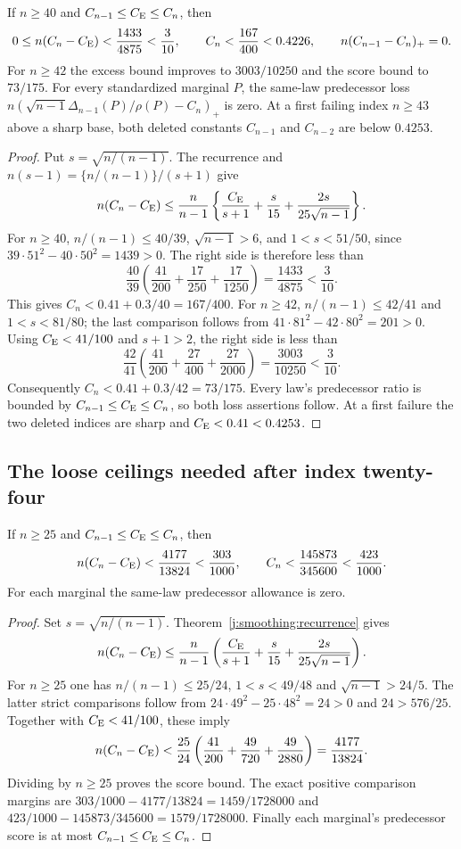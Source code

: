 \begin{corollary}
\label{j:smoothing:entry}
If $n\ge40$ and $C_{n-1}\le C_{\mathrm E}\le C_n$, then
\[
 0\le n(C_n-C_{\mathrm E})<\frac{1433}{4875}<\frac3{10},
 \qquad C_n<\frac{167}{400}<0.4226,
 \qquad n(C_{n-1}-C_n)_+=0.
\]
For $n\ge42$ the excess bound improves to $3003/10250$ and
the score bound to $73/175$.
For every standardized marginal $P$, the same-law predecessor loss
$n(\sqrt{n-1}\Delta_{n-1}(P)/\rho(P)-C_n)_+$ is zero.
At a first failing index $n\ge43$ above a sharp base, both deleted
constants $C_{n-1}$ and $C_{n-2}$ are below $0.4253$.
\end{corollary}
\begin{proof}
Put $s=\sqrt{n/(n-1)}$. The recurrence and
$n(s-1)=\{n/(n-1)\}/(s+1)$ give
\[
 n(C_n-C_{\mathrm E})\le\frac n{n-1}
 \left\{\frac{C_{\mathrm E}}{s+1}+\frac{s}{15}
                  +\frac{2s}{25\sqrt{n-1}}\right\}.
\]
For $n\ge40$, $n/(n-1)\le40/39$, $\sqrt{n-1}>6$, and
$1<s<51/50$, since $39\cdot51^2-40\cdot50^2=1439>0$.
The right side is therefore less than
\[
 \frac{40}{39}\left(\frac{41}{200}
                  +\frac{17}{250}+\frac{17}{1250}\right)
 =\frac{1433}{4875}<\frac3{10}.
\]
This gives $C_n<0.41+0.3/40=167/400$.
For $n\ge42$, $n/(n-1)\le42/41$ and
$1<s<81/80$; the last comparison follows from
$41\cdot81^2-42\cdot80^2=201>0$.
Using $C_{\mathrm E}<41/100$ and $s+1>2$, the right side is less than
\[
 \frac{42}{41}\left(\frac{41}{200}
                    +\frac{27}{400}+\frac{27}{2000}\right)
 =\frac{3003}{10250}<\frac3{10}.
\]
Consequently $C_n<0.41+0.3/42=73/175$.
Every law's predecessor ratio is bounded by $C_{n-1}\le C_{\mathrm E}\le C_n$,
so both loss assertions follow. At a first failure the two deleted
indices are sharp and $C_{\mathrm E}<0.41<0.4253$.
\end{proof}

\subsection{The loose ceilings needed after index twenty-four}
\label{j:smoothing:finite-ceilings}
\begin{lemma}\label{j:smoothing:entry25}
If $n\ge25$ and $C_{n-1}\le C_{\mathrm E}\le C_n$, then
\[
 n(C_n-C_{\mathrm E})<\frac{4177}{13824}<\frac{303}{1000},
 \qquad C_n<\frac{145873}{345600}<\frac{423}{1000}.
\]
For each marginal the same-law predecessor allowance is zero.
\end{lemma}
\begin{proof}
Set $s=\sqrt{n/(n-1)}$. Theorem~\ref{j:smoothing:recurrence} gives
\[
 n(C_n-C_{\mathrm E})\le\frac{n}{n-1}
 \left(\frac{C_{\mathrm E}}{s+1}+\frac{s}{15}
                       +\frac{2s}{25\sqrt{n-1}}\right).
\]
For $n\ge25$ one has $n/(n-1)\le25/24$,
$1<s<49/48$ and $\sqrt{n-1}>24/5$.
The latter strict comparisons follow from
$24\cdot49^2-25\cdot48^2=24>0$ and $24>576/25$.
Together with $C_{\mathrm E}<41/100$, these imply
\[
 n(C_n-C_{\mathrm E})<\frac{25}{24}
  \left(\frac{41}{200}+\frac{49}{720}+\frac{49}{2880}\right)
 =\frac{4177}{13824}.
\]
Dividing by $n\ge25$ proves the score bound. The exact positive
comparison margins are
$303/1000-4177/13824=1459/1728000$ and
$423/1000-145873/345600=1579/1728000$.
Finally each marginal's predecessor score is at most $C_{n-1}\le C_{\mathrm E}\le C_n$.
\end{proof}

